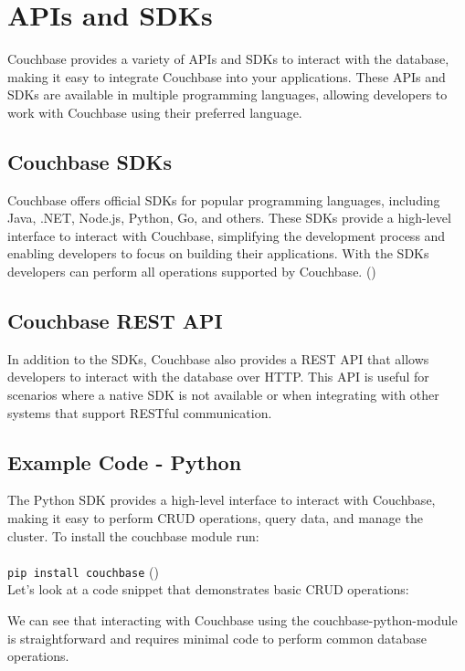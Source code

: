 \chapter{APIs and SDKs}

Couchbase provides a variety of APIs and SDKs to interact with the database, making it easy to integrate Couchbase into your applications. These APIs and SDKs are available in multiple programming languages, allowing developers to work with Couchbase using their preferred language.

\section{Couchbase SDKs}
Couchbase offers official SDKs for popular programming languages, including Java, .NET, Node.js, Python, Go, and others. These SDKs provide a high-level interface to interact with Couchbase, simplifying the development process and enabling developers to focus on building their applications. With the SDKs developers can perform all operations supported by Couchbase.
(\cite{couchbaseSDKs})


\section{Couchbase REST API}
In addition to the SDKs, Couchbase also provides a REST API that allows developers to interact with the database over HTTP. This API is useful for scenarios where a native SDK is not available or when integrating with other systems that support RESTful communication.


\section{Example Code - Python}
The Python SDK provides a high-level interface to interact with Couchbase, making it easy to perform CRUD operations, query data, and manage the cluster. To install the couchbase module run:
\\
\\
\lstinline|pip install couchbase|
(\cite{couchbasePythonModule})
\\

Let's look at a code snippet that demonstrates basic CRUD operations:


We can see that interacting with Couchbase using the couchbase-python-module is straightforward and requires minimal code to perform common database operations.